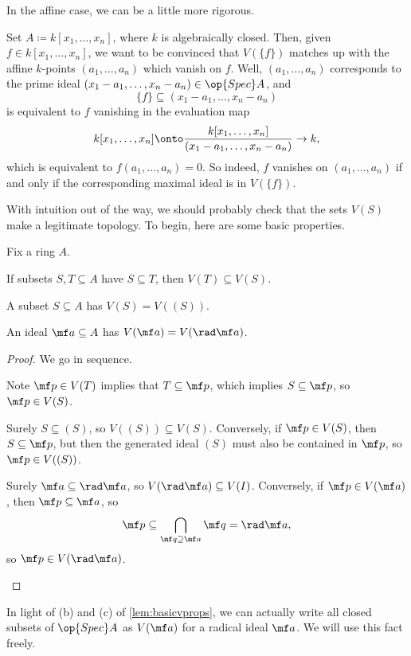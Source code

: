 \documentclass[../notes.tex]{subfiles}
\begin{document}
In the affine case, we can be a little more rigorous.
\begin{example}
	Set $A\coloneqq k[x_1,\ldots,x_n]$, where $k$ is algebraically closed. Then, given $f\in k[x_1,\ldots,x_n]$, we want to be convinced that $V(\{f\})$ matches up with the affine $k$-points $(a_1,\ldots,a_n)$ which vanish on $f$. Well, $(a_1,\ldots,a_n)$ corresponds to the prime ideal $(x_1-a_1,\ldots,x_n-a_n)\in\op{Spec}A$, and
	\[\{f\}\subseteq(x_1-a_1,\ldots,x_n-a_n)\]
	is equivalent to $f$ vanishing in the evaluation map
	\[k[x_1,\ldots,x_n]\onto\frac{k[x_1,\ldots,x_n]}{(x_1-a_1,\ldots,x_n-a_n)}\to k,\]
	which is equivalent to $f(a_1,\ldots,a_n)=0$. So indeed, $f$ vanishes on $(a_1,\ldots,a_n)$ if and only if the corresponding maximal ideal is in $V(\{f\})$.
\end{example}
With intuition out of the way, we should probably check that the sets $V(S)$ make a legitimate topology. To begin, here are some basic properties.
\begin{lemma} \label{lem:basicvprops}
	Fix a ring $A$.
	\begin{listalph}
		\item If subsets $S,T\subseteq A$ have $S\subseteq T$, then $V(T)\subseteq V(S)$.
		\item A subset $S\subseteq A$ has $V(S)=V((S))$.
		\item An ideal $\mf a\subseteq A$ has $V(\mf a)=V(\rad\mf a)$.
	\end{listalph}
\end{lemma}
\begin{proof}
	We go in sequence.
	\begin{listalph}
		\item Note $\mf p\in V(T)$ implies that $T\subseteq\mf p$, which implies $S\subseteq\mf p$, so $\mf p\in V(S)$.
		\item Surely $S\subseteq(S)$, so $V((S))\subseteq V(S)$. Conversely, if $\mf p\in V(S)$, then $S\subseteq\mf p$, but then the generated ideal $(S)$ must also be contained in $\mf p$, so $\mf p\in V((S))$.
		\item Surely $\mf a\subseteq\rad\mf a$, so $V(\rad\mf a)\subseteq V(I)$. Conversely, if $\mf p\in V(\mf a)$, then $\mf p\subseteq\mf a$, so
		\[\mf p\subseteq\bigcap_{\mf q\supseteq\mf a}\mf q=\rad\mf a,\]
		so $\mf p\in V(\rad\mf a)$.
		\qedhere
	\end{listalph}
\end{proof}
\begin{remark}
	In light of (b) and (c) of \autoref{lem:basicvprops}, we can actually write all closed subsets of $\op{Spec}A$ as $V(\mf a)$ for a radical ideal $\mf a$. We will use this fact freely.
\end{remark}
\end{document}
